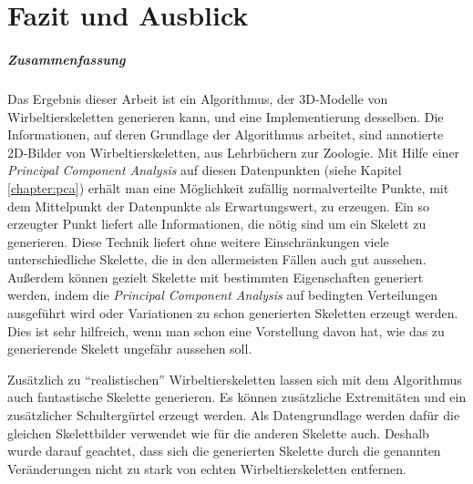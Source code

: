 \chapter{Fazit und Ausblick}
\label{chapter:conclusion}

% 
% 

\paragraph{Zusammenfassung}

Das Ergebnis dieser Arbeit ist ein Algorithmus, der 3D-Modelle von Wirbeltierskeletten generieren kann, und eine Implementierung desselben. Die Informationen, auf deren Grundlage der Algorithmus arbeitet, sind annotierte 2D-Bilder von Wirbeltierskeletten, \zb aus Lehrbüchern zur Zoologie. Mit Hilfe einer \emph{Principal Component Analysis} auf diesen Datenpunkten (siehe Kapitel \ref{chapter:pca}) erhält man eine Möglichkeit zufällig normalverteilte Punkte, mit dem Mittelpunkt der Datenpunkte als Erwartungswert, zu erzeugen. Ein so erzeugter Punkt liefert alle Informationen, die nötig sind um ein Skelett zu generieren.
Diese Technik liefert ohne weitere Einschränkungen viele unterschiedliche Skelette, die in den allermeisten Fällen auch gut aussehen.\\
Außerdem können gezielt Skelette mit bestimmten Eigenschaften generiert werden, indem die \emph{Principal Component Analysis} auf bedingten Verteilungen ausgeführt wird oder Variationen zu schon generierten Skeletten erzeugt werden. Dies ist sehr hilfreich, wenn man schon eine Vorstellung davon hat, wie das zu generierende Skelett ungefähr aussehen soll.

Zusätzlich zu "`realistischen"' Wirbeltierskeletten lassen sich mit dem Algorithmus auch fantastische Skelette generieren. Es können zusätzliche Extremitäten und ein zusätzlicher Schultergürtel erzeugt werden. Als Datengrundlage werden dafür die gleichen Skelettbilder verwendet wie für die anderen Skelette auch. Deshalb wurde darauf geachtet, dass sich die generierten Skelette durch die genannten Veränderungen nicht zu stark von echten Wirbeltierskeletten entfernen.  


